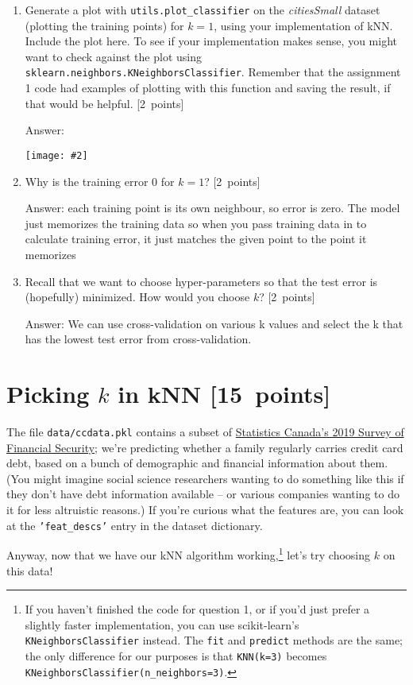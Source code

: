 \documentclass{article}
\newcommand{\blu}[1]{{\textcolor{blu}{#1}}}
\newcommand{\gre}[1]{\textcolor{gre}{#1}}
\newcommand\ans[1]{\par\gre{Answer: #1}}
\let\ask\blu
\newcommand\pts[1]{\textcolor{pointscolour}{[#1~points]}}
\newcommand{\centerfig}[2]{\begin{center}\texttt{[image: \#2]}\end{center}}
\begin{document}
\begin{enumerate}
        \item Generate a plot with \texttt{utils.plot\_classifier} on the \emph{citiesSmall} dataset (plotting the training points) for $k=1$, using your implementation of kNN. \ask{Include the plot here.} To see if your implementation makes sense, you might want to check against the plot using \texttt{sklearn.neighbors.KNeighborsClassifier}. Remember that the assignment 1 code had examples of plotting with this function and saving the result, if that would be helpful. \pts{2}
        \ans{
        \centerfig{.6}{figs/q1_3_citiesSmallKNNPlot.pdf}
        }
        \item Why is the training error $0$ for $k=1$? \pts{2}
        \ans{each training point is its own neighbour, so error is zero. The model just memorizes the training data so when you pass training data in to calculate training error, it just matches the given point to the point it memorizes}
        
        \item Recall that we want to choose hyper-parameters so that the test error is (hopefully) minimized. How would you choose $k$? \pts{2}
        \ans{We can use cross-validation on various k values and select the k that has the lowest test error from cross-validation.}
        
    \end{enumerate}

    \clearpage
    \section{Picking $k$ in kNN \pts{15}}
    The file \texttt{data/ccdata.pkl} contains a subset of \href{https://www23.statcan.gc.ca/imdb/p2SV.pl?Function=getSurvey&SDDS=2620}{Statistics Canada's 2019 Survey of Financial Security}; we're predicting whether a family regularly carries credit card debt, based on a bunch of demographic and financial information about them. (You might imagine social science researchers wanting to do something like this if they don't have debt information available -- or various companies wanting to do it for less altruistic reasons.) If you're curious what the features are, you can look at the \texttt{'feat\_descs'} entry in the dataset dictionary.

    Anyway, now that we have our kNN algorithm working,\footnote{If you haven't finished the code for question 1, or if you'd just prefer a slightly faster implementation, you can use scikit-learn's \texttt{KNeighborsClassifier} instead. The \texttt{fit} and \texttt{predict} methods are the same; the only difference for our purposes is that \texttt{KNN(k=3)} becomes \texttt{KNeighborsClassifier(n\_neighbors=3)}.} let's try choosing $k$ on this data!
\end{document}
